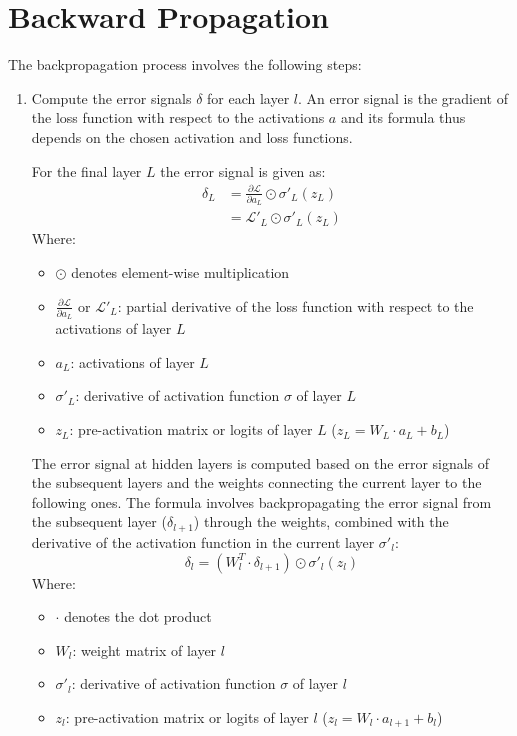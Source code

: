 \documentclass[a4paper]{article}
\newcommand{\ELL}{\mathcal{L}}
\begin{document}
\section*{Backward Propagation}
The backpropagation process involves the following steps:
\begin{enumerate}
    \item Compute the error signals $\delta$ for each layer $l$. An error signal is the gradient of the loss function with respect to the activations $a$ and its formula thus depends on the chosen activation and loss functions.
    
    For the final layer $L$ the error signal is given as:
    \begin{align*}
        \delta_L &= \frac{\partial\ELL}{\partial a_L} \odot \sigma'_L(z_L)\\
                 &= \ELL'_L \odot \sigma'_L(z_L)
    \end{align*}
    Where:
    \begin{itemize}
        \item $\odot$ denotes element-wise multiplication
        \item $\frac{\partial\ELL}{\partial a_L}$ or $\ELL'_L$: partial derivative of the loss function with respect to the activations of layer $L$
        \item $a_L$: activations of layer $L$
        \item $\sigma'_L$: derivative of activation function $\sigma$ of layer $L$
        \item $z_L$: pre-activation matrix or logits of layer $L$ ($z_L = W_L\cdot a_L + b_L$)
    \end{itemize}
    The error signal at hidden layers is computed based on the error signals of the subsequent layers and the weights connecting the current layer to the following ones. The formula involves backpropagating the error signal from the subsequent layer ($\delta_{l+1}$) through the weights, combined with the derivative of the activation function in the current layer $\sigma'_l$:
    \begin{equation*}
        \delta_l = (W_l^T \cdot \delta_{l+1}) \odot \sigma'_l(z_l)
    \end{equation*}
    Where:
    \begin{itemize}
        \item $\cdot$ denotes the dot product
        \item $W_l$: weight matrix of layer $l$
        \item $\sigma'_l$: derivative of activation function $\sigma$ of layer $l$
        \item $z_l$: pre-activation matrix or logits of layer $l$ ($z_l = W_l\cdot a_{l+1} + b_l$)
    \end{itemize}


\end{enumerate}
\end{document}
